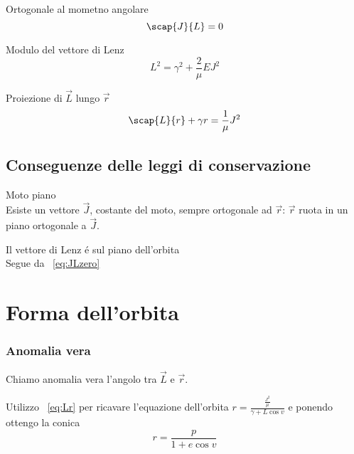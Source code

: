 \begin{itemize*}
\item Ortogonale al mometno angolare
\begin{equation*}\label{eq:JLzero}
\scap{J}{L}=0
\end{equation*}

\item Modulo del vettore di Lenz
\begin{equation*}\label{eq:moduloL}
L^2=\gamma^2+\frac{2}{\mu}EJ^2
\end{equation*}

\item Proiezione di $\vec{L}$ lungo $\vec{r}$
\begin{equation*}\label{eq:Lr}
\scap{L}{r}+\gamma r=\frac{1}{\mu}J^2
\end{equation*}
\end{itemize*}

\subsection{Conseguenze delle leggi di conservazione}

\begin{enumerate*}
\item Moto piano\\
Esiste un vettore $\vec{J}$, costante del moto, sempre ortogonale ad $\vec{r}$: $\vec{r}$ ruota in un piano ortogonale a $\vec{J}$.
\item Il vettore di Lenz \'e sul piano dell'orbita\\
Segue da ~\ref{eq:JLzero}
\end{enumerate*}


\section{Forma dell'orbita}


\subsubsection{Anomalia vera}

Chiamo anomalia vera l'angolo tra $\vec{L}$ e $\vec{r}$.

Utilizzo ~\ref{eq:Lr} per ricavare l'equazione dell'orbita $r=\frac{\frac{J^2}{\mu}}{\gamma+L\cos{v}}$ e ponendo  ottengo la conica
\begin{equation*}\label{eq:orbitaconica}
r=\frac{p}{1+e\cos{v}}
\end{equation*}

